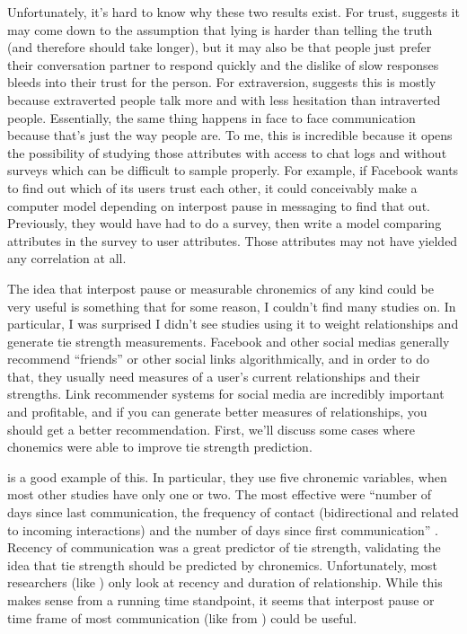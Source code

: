\documentclass[
  stu]{apa7}
\begin{document}
Unfortunately, it's hard to know why these two results exist. For trust,
\textcite{kalman13} suggests it may come down to the assumption that
lying is harder than telling the truth (and therefore should take
longer), but it may also be that people just prefer their conversation
partner to respond quickly and the dislike of slow responses bleeds into
their trust for the person. For extraversion, \textcite{kalman13}
suggests this is mostly because extraverted people talk more and with
less hesitation than intraverted people. Essentially, the same thing
happens in face to face communication because that's just the way people
are. To me, this is incredible because it opens the possibility of
studying those attributes with access to chat logs and without surveys
which can be difficult to sample properly. For example, if Facebook
wants to find out which of its users trust each other, it could
conceivably make a computer model depending on interpost pause in
messaging to find that out. Previously, they would have had to do a
survey, then write a model comparing attributes in the survey to user
attributes. Those attributes may not have yielded any correlation at
all.

The idea that interpost pause or measurable chronemics of any kind could
be very useful is something that for some reason, I couldn't find many
studies on. In particular, I was surprised I didn't see studies using it
to weight relationships and generate tie strength measurements. Facebook
and other social medias generally recommend ``friends'' or other social
links algorithmically, and in order to do that, they usually need
measures of a user's current relationships and their strengths. Link
recommender systems for social media are incredibly important and
profitable, and if you can generate better measures of relationships,
you should get a better recommendation. First, we'll discuss some cases
where chonemics were able to improve tie strength prediction.

\textcite{arnaboldi13} is a good example of this. In particular, they
use five chronemic variables, when most other studies have only one or
two. The most effective were ``number of days since last communication,
the frequency of contact (bidirectional and related to incoming
interactions) and the number of days since first communication''
\autocite[ 1137]{arnaboldi13}. Recency of communication was a great
predictor of tie strength, validating the idea that tie strength should
be predicted by chronemics. Unfortunately, most researchers (like
\textcite{servia-rodriguez14}) only look at recency and duration of
relationship. While this makes sense from a running time standpoint, it
seems that interpost pause or time frame of most communication (like
from \textcite{walther95}) could be useful.
\end{document}
